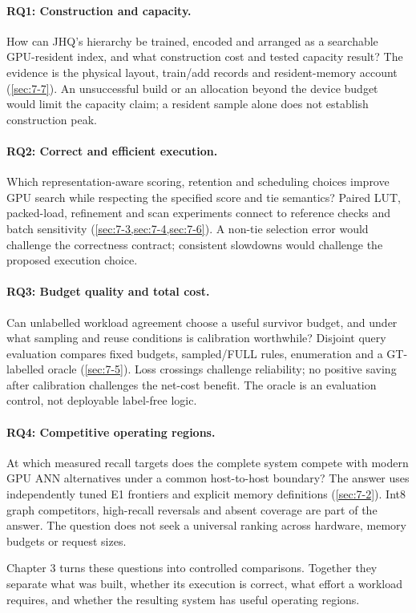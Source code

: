 \paragraph{RQ1: Construction and capacity.}
How can JHQ's hierarchy be trained, encoded and arranged as a searchable
GPU-resident index, and what construction cost and tested capacity result?
The evidence is the physical layout, train/add records and resident-memory
account (\cref{sec:7-7}). An unsuccessful build or an allocation beyond the
device budget would limit the capacity claim; a resident sample alone does
not establish construction peak.

\paragraph{RQ2: Correct and efficient execution.}
Which representation-aware scoring, retention and scheduling choices
improve GPU search while respecting the specified score and tie semantics?
Paired LUT, packed-load, refinement and scan experiments connect to reference
checks and batch sensitivity (\cref{sec:7-3,sec:7-4,sec:7-6}). A non-tie
selection error would challenge the correctness contract; consistent
slowdowns would challenge the proposed execution choice.

\paragraph{RQ3: Budget quality and total cost.}
Can unlabelled workload agreement choose a useful survivor budget, and under
what sampling and reuse conditions is calibration worthwhile? Disjoint query
evaluation compares fixed budgets, sampled/FULL rules, enumeration and a
GT-labelled oracle (\cref{sec:7-5}). Loss crossings challenge reliability;
no positive saving after calibration challenges the net-cost benefit.
The oracle is an evaluation control, not deployable label-free logic.

\paragraph{RQ4: Competitive operating regions.}
At which measured recall targets does the complete system compete with
modern GPU ANN alternatives under a common host-to-host boundary?
The answer uses independently tuned E1 frontiers and explicit memory
definitions (\cref{sec:7-2}). Int8 graph competitors, high-recall reversals
and absent coverage are part of the answer. The question does not seek a
universal ranking across hardware, memory budgets or request sizes.

Chapter 3 turns these questions into controlled comparisons. Together they
separate what was built, whether its execution is correct, what effort a
workload requires, and whether the resulting system has useful operating
regions.
